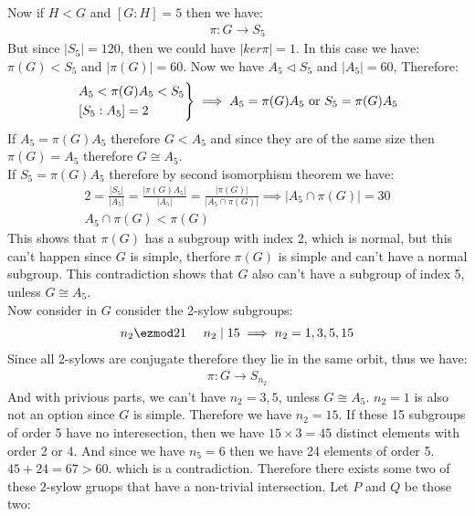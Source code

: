 \begin{enumerate}[label=\ilabel]
        Now if $H < G$ and $[G: H] = 5$ then we have:
        \begin{gather*}
            \pi: G \to S_5
        \end{gather*}
        But since $|S_5| = 120$, then we could have $|ker \pi| = 1$. In this case we have: $\pi(G) < S_5$ and $|\pi(G)| = 60$. Now we have $A_5 \lhd S_5$ and $|A_5| = 60$, Therefore:
        \begin{gather*}
            \begin{rcases}
                A_5 < \pi(G) A_5 < S_5 \\
                [S_5 : A_5] = 2
            \end{rcases} \implies A_5 = \pi(G) A_5 \text{ or } S_5 = \pi(G) A_5
        \end{gather*}
        If $A_5 = \pi(G) A_5$ therefore $G < A_5$ and since they are of the same size then $\pi(G) = A_5$ therefore $G \cong A_5$. \\
        If $S_5 = \pi(G) A_5$ therefore by second isomorphism theorem we have:
        \begin{gather*}
            2 = \frac{|S_5|}{|A_5|} = \frac{|\pi(G) A_5|}{|A_5|}= \frac{|\pi(G)|}{|A_5 \cap \pi(G)|}  \implies |A_5 \cap \pi(G)| = 30 \\
            A_5 \cap \pi(G) < \pi(G)
        \end{gather*}
        This shows that $\pi(G)$ has a subgroup with index 2, which is normal, but this can't happen since $G$ is simple, therfore $\pi(G)$ is simple and can't have a normal subgroup. This contradiction shows that $G$ also can't have a subgroup of index 5, unless $G \cong A_5$. \\
        Now consider in $G$ consider the 2-sylow subgroups:
        \begin{gather*}
            n_2 \ezmod 2 1 \ \ \ \ n_2 \mid 15 \implies n_2 = 1, 3, 5, 15
        \end{gather*}
        Since all 2-sylows are conjugate therefore they lie in the same orbit, thus we have:
        \begin{gather*}
            \pi: G \to S_{n_2}
        \end{gather*}
        And with privious parts, we can't have $n_2 = 3, 5$, unless $G \cong A_5$. $n_2 = 1$ is also not an option since $G$ is simple. Therefore we have $n_2 = 15$. If these 15 subgroups of order 5 have no interesection, then we have $15 \times 3 = 45$ distinct elements with order 2 or 4. And since we have $n_5 = 6$ then we have 24 elements of order 5. $45 + 24 = 67 > 60$. which is a contradiction. Therefore there exists some two of these 2-sylow gruops that have a non-trivial intersection. Let $P$ and $Q$ be those two:

\end{enumerate}
